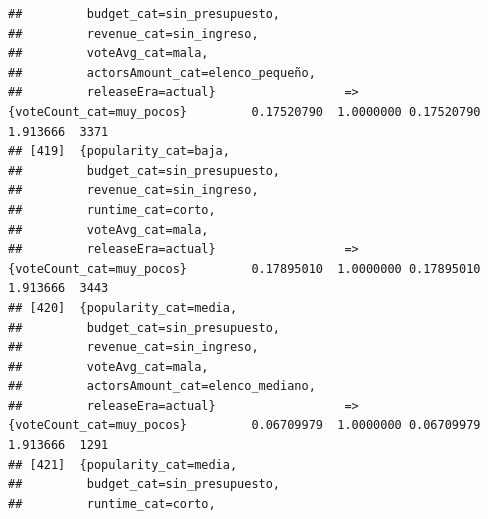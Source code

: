 \documentclass[
]{article}
\begin{document}
\begin{verbatim}
##         budget_cat=sin_presupuesto,                                                                                             
##         revenue_cat=sin_ingreso,                                                                                                
##         voteAvg_cat=mala,                                                                                                       
##         actorsAmount_cat=elenco_pequeño,                                                                                        
##         releaseEra=actual}                  => {voteCount_cat=muy_pocos}         0.17520790  1.0000000 0.17520790 1.913666  3371
## [419]  {popularity_cat=baja,                                                                                                    
##         budget_cat=sin_presupuesto,                                                                                             
##         revenue_cat=sin_ingreso,                                                                                                
##         runtime_cat=corto,                                                                                                      
##         voteAvg_cat=mala,                                                                                                       
##         releaseEra=actual}                  => {voteCount_cat=muy_pocos}         0.17895010  1.0000000 0.17895010 1.913666  3443
## [420]  {popularity_cat=media,                                                                                                   
##         budget_cat=sin_presupuesto,                                                                                             
##         revenue_cat=sin_ingreso,                                                                                                
##         voteAvg_cat=mala,                                                                                                       
##         actorsAmount_cat=elenco_mediano,                                                                                        
##         releaseEra=actual}                  => {voteCount_cat=muy_pocos}         0.06709979  1.0000000 0.06709979 1.913666  1291
## [421]  {popularity_cat=media,                                                                                                   
##         budget_cat=sin_presupuesto,                                                                                             
##         runtime_cat=corto,                                                                                                      

\end{verbatim}
\end{document}
